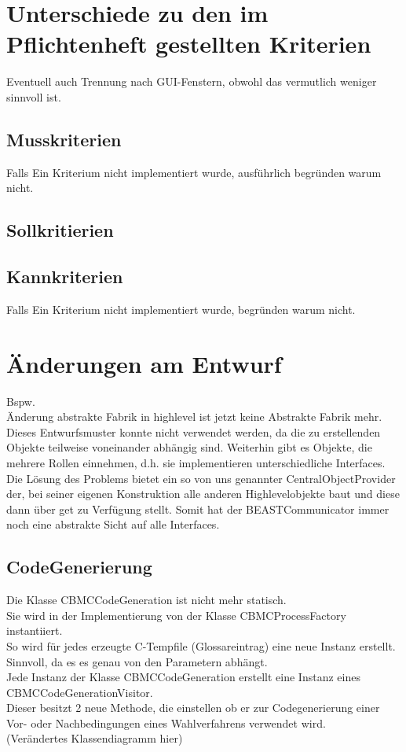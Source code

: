 \documentclass[a4paper]{scrreprt}
\begin{document}
\chapter{Unterschiede zu den im Pflichtenheft gestellten Kriterien}


Eventuell auch Trennung nach GUI-Fenstern, obwohl das vermutlich weniger sinnvoll ist.
\section{Musskriterien}
Falls Ein Kriterium nicht implementiert wurde, ausführlich begründen warum nicht.

\section{Sollkritierien}
\section{Kannkriterien}
Falls Ein Kriterium nicht implementiert wurde, begründen warum nicht. 

\chapter{Änderungen am Entwurf}
Bspw. \\
Änderung abstrakte Fabrik in highlevel ist jetzt keine Abstrakte Fabrik mehr.\\ Dieses Entwurfsmuster konnte nicht verwendet werden, da die zu erstellenden Objekte teilweise voneinander abhängig sind. Weiterhin gibt es Objekte, die mehrere Rollen einnehmen, d.h. sie implementieren unterschiedliche Interfaces. \\
Die Lösung des Problems bietet ein so von uns genannter CentralObjectProvider der, bei seiner eigenen Konstruktion alle anderen Highlevelobjekte baut und diese dann über get zu Verfügung stellt.
Somit hat der BEASTCommunicator immer noch eine abstrakte Sicht auf alle Interfaces.

\section{CodeGenerierung}

Die Klasse CBMCCodeGeneration ist nicht mehr statisch. \\
Sie wird in der Implementierung von der Klasse CBMCProcessFactory instantiiert. \\
So wird für jedes erzeugte C-Tempfile (Glossareintrag) eine neue Instanz erstellt. Sinnvoll, da es es genau von den Parametern abhängt. \\
Jede Instanz der Klasse CBMCCodeGeneration erstellt eine Instanz eines CBMCCodeGenerationVisitor. \\
Dieser besitzt 2 neue Methode, die einstellen ob er zur Codegenerierung einer Vor- oder Nachbedingungen eines Wahlverfahrens verwendet wird.  \\
(Verändertes Klassendiagramm hier)
\end{document}
